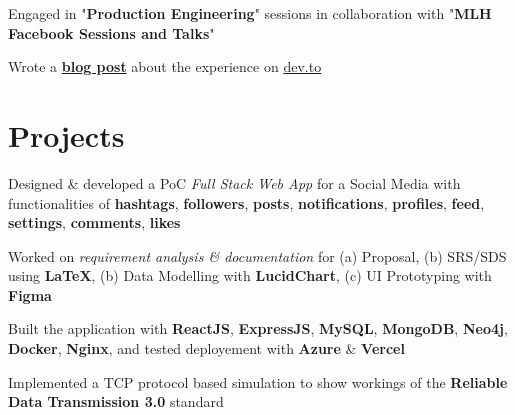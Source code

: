 \documentclass[]{openfont}
\begin{document}
\begin{minipage}[t]{0.66\textwidth}
\begin{tightemize}
    \item Engaged in "\textbf{Production Engineering}" sessions in collaboration with "\textbf{MLH Facebook Sessions and Talks}"
    
    \item Wrote a \href{https://dev.to/rubix982/mlh-open-source-mapillary-me-nji}{\textbf{blog post}} about the experience on \href{https://dev.to/}{dev.to}
\end{tightemize}
\sectionsep


\section{Projects}
\begin{tightemize}
    \item Designed \& developed a PoC \textit{Full Stack Web App} for a Social Media with functionalities of \textbf{hashtags}, \textbf{followers}, \textbf{posts}, \textbf{notifications}, \textbf{profiles}, \textbf{feed}, \textbf{settings}, \textbf{comments}, \textbf{likes} \\
    
    \item Worked on \textit{requirement analysis \& documentation}  for (a) Proposal, (b) SRS/SDS using \textbf{LaTeX}, (b) Data Modelling with \textbf{LucidChart}, (c) UI Prototyping with \textbf{Figma} \\
    
    \item Built the application with \textbf{ReactJS}, \textbf{ExpressJS}, \textbf{MySQL}, \textbf{MongoDB}, \textbf{Neo4j}, \textbf{Docker}, \textbf{Nginx}, and tested deployement with  \textbf{Azure} \& \textbf{Vercel} \\
\end{tightemize}
\sectionsep

\begin{tightemize}
    \item Implemented a TCP protocol based simulation to show workings of the \textbf{Reliable Data Transmission 3.0} standard \\


\end{tightemize}
\end{minipage}
\end{document}
